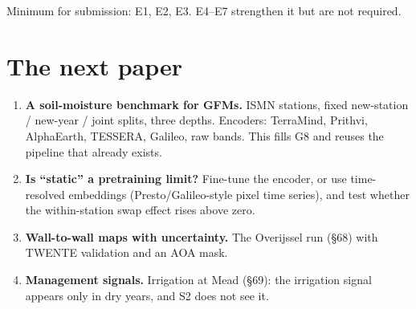 \documentclass[11pt,a4paper]{article}
\begin{document}
Minimum for submission: E1, E2, E3. E4--E7 strengthen it but are not required.

\section{The next paper}
\begin{enumerate}[label=N\arabic*.]
\item \textbf{A soil-moisture benchmark for GFMs.} ISMN stations, fixed new-station / new-year /
  joint splits, three depths. Encoders: TerraMind, Prithvi, AlphaEarth, TESSERA, Galileo, raw
  bands. This fills G8 and reuses the pipeline that already exists.
\item \textbf{Is ``static'' a pretraining limit?} Fine-tune the encoder, or use time-resolved
  embeddings (Presto/Galileo-style pixel time series), and test whether the within-station swap
  effect rises above zero.
\item \textbf{Wall-to-wall maps with uncertainty.} The Overijssel run (\S68) with TWENTE validation
  and an AOA mask.
\item \textbf{Management signals.} Irrigation at Mead (\S69): the irrigation signal appears only
  in dry years, and S2 does not see it.
\end{enumerate}



\end{document}
